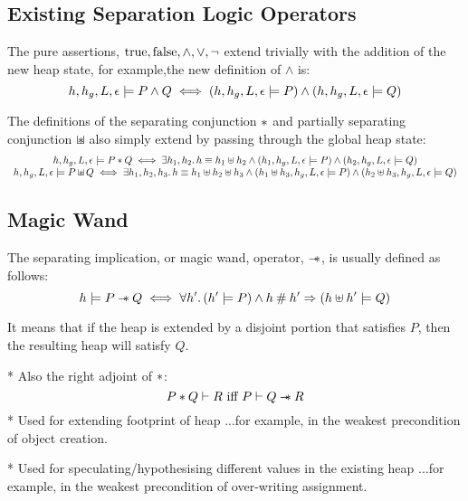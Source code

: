 \documentclass[a4paper,notitlepage]{report}
\begin{document}
\subsection{Existing Separation Logic Operators}
The pure assertions, $\text{true},\text{false},\land,\lor,\lnot$ extend trivially with the
addition of the new heap state, for example,the new definition of $\land$ is:
\[
  h,h_g,L,\epsilon \models P \land Q \iff
    (h,h_g,L,\epsilon \models P) \land (h,h_g,L,\epsilon \models Q)
\]

The definitions of the separating conjunction $\mathbin{*}$ and partially separating
conjunction $\mathbin{\sqcup\mkern-10mu*}$ also simply extend by passing through the global heap state:
\[\begin{array}{c}
  h,h_g,L,\epsilon \models P \mathbin{*} Q \iff
    \exists h_1,h_2 \mathpunct{.} h \equiv h_1 \uplus h_2 \land
    (h_1,h_g,L,\epsilon \models P) \land (h_2,h_g,L,\epsilon \models Q) \\
  h,h_g,L,\epsilon \models P \mathbin{\sqcup\mkern-10mu*} Q \iff
    \exists h_1,h_2,h_3 \mathpunct{.} h \equiv h_1 \uplus h_2 \uplus h_3 \land
    (h_1 \uplus h_3, h_g, L, \epsilon \models P) \land
    (h_2 \uplus h_3, h_g, L, \epsilon \models Q)
\end{array}\]

\subsection{Magic Wand}
\label{sec:wand}
The separating implication, or magic wand, operator, $\mathbin{-\mkern-6mu *}$, is usually defined
as follows:
\[
  h \models P \mathbin{-\mkern-6mu *} Q \iff \forall h' \mathpunct{.} (h' \models P) \land h \mathbin{\#}
    h' \Rightarrow (h \uplus h' \models Q)
\]

It means that if the heap is extended by a disjoint portion that satisfies $P$,
then the resulting heap will satisfy $Q$.

* Also the right adjoint of $\mathbin{*}$:
\newcommand{\entails}{\vdash}
\[
P \sep Q \entails R \text{ iff } P \entails Q \wand R
\]
* Used for extending footprint of heap
    ...for example, in the weakest precondition of object creation.

* Used for speculating/hypothesising different values in the existing heap
    ...for example, in the weakest precondition of over-writing assignment.
\end{document}
